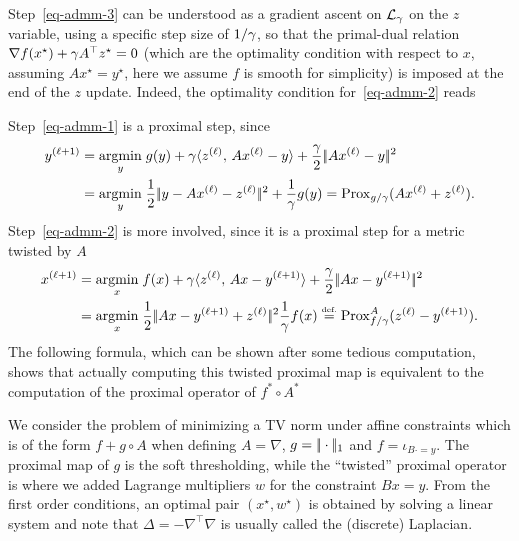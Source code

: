 Step~\eqref{eq-admm-3} can be understood as a gradient ascent on $\mathcal{L}_\gamma$ on the $z$ variable, using a specific step size of $1/\gamma$, so that the primal-dual relation $\nabla f(x^\star) + \gamma A^\top z^\star=0$ (which are the optimality condition with respect to $x$, assuming $A x^\star=y^\star$, here we assume $f$ is smooth for simplicity) is imposed at the end of the $z$ update. Indeed, the optimality condition for~\eqref{eq-admm-2} reads

Step~\eqref{eq-admm-1} is a proximal step, since
\begin{align*}
	y^{(\ell+1)} &= \underset{y}{\operatorname{argmin}}\; 
	g(y) + \gamma \langle z^{(\ell)},\,Ax^{(\ell)}-y\rangle + \frac{\gamma}{2}|\!| Ax^{(\ell)}-y |\!|^2
	\\
	&=\underset{y}{\operatorname{argmin}}\; \frac{1}{2}|\!| y - Ax^{(\ell)} - z^{(\ell)} |\!|^2 + \frac{1}{\gamma} g(y)
	= \operatorname{Prox}_{g/\gamma}( Ax^{(\ell)} + z^{(\ell)} ).
\end{align*}
Step~\eqref{eq-admm-2} is more involved, since it is a proximal step for a metric twisted by $A$
\begin{align*}
	x^{(\ell+1)} &= \underset{x}{\operatorname{argmin}}\; 
	f(x) + \gamma \langle z^{(\ell)},\,Ax-y^{(\ell+1)}\rangle + \frac{\gamma}{2}|\!| Ax-y^{(\ell+1)} |\!|^2
	\\
	&= \underset{x}{\operatorname{argmin}}\; 
	\frac{1}{2}|\!| Ax-y^{(\ell+1)} + z^{(\ell)} |\!|^2
	\frac{1}{\gamma}f(x)
	\stackrel{\mbox{\upshape\tiny def.}}{=} \operatorname{Prox}^A_{f/\gamma}( z^{(\ell)} - y^{(\ell+1)} ).
\end{align*}
The following formula, which can be shown after some tedious computation, shows that actually computing this twisted proximal map is equivalent to the computation of the proximal operator of $f^* \circ A^*$

\begin{exmp}
	We consider the problem of minimizing a TV norm under affine constraints
	which is of the form $f + g \circ A$ when defining $A=\nabla$, $g=|\!| \cdot |\!|_1$ and $f=\iota_{B \cdot = y}$. 
	The proximal map of $g$ is the soft thresholding, while the ``twisted'' proximal operator is
	where we added Lagrange multipliers $w$ for the constraint $Bx=y$. From the first order conditions, an optimal pair $(x^\star,w^\star)$ is obtained by solving a linear system
	and note that $\Delta=-\nabla^\top \nabla$ is usually called the (discrete) Laplacian. 
\end{exmp}

